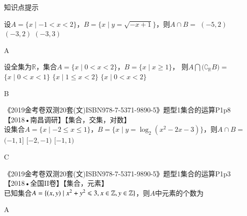 \begin{exercise}
\begin{framed}{\heiti 知识点提示}
\begin{itemize}
\begin{minipage}[t]{0.48\linewidth}
              \end{minipage}
          \end{itemize}
        \end{framed}
    \item %
          设$A=\{x\mid -1<x<2\}$，$B=\{x\mid y=\sqrt{-x+1}\}$，则$A\cap B=$\xz
          \xx{$(-1,1]$}
           {$(-5,2)$}
           {$(-3,2)$}
           {$(-3,3)$}
          \begin{answer}
            A
          \end{answer}
    \item %
      设全集为$\mathbb{R}$，集合$A=\{x\mid 0<x<2\}$，$B=\{x\mid x\geqslant1\}$，
      则$A\bigcap\bigl(\complement_{\mathbb R}B\bigr)=$\xz
       {$\{x\mid 0<x<1\}$}
       {$\{x\mid 1\leqslant x<2\}$}
       {$\{x\mid 0<x<2\}$}
      \begin{answer}
        B
      \end{answer}
    \item 《2019金考卷双测20套(文)ISBN978-7-5371-9890-5》题型1集合的运算P1p8【2018•南昌调研】【集合，交集，对数】\\
      设集合$A=\{x\mid -2\leqslant x\leqslant 1\}$，$B=\{x\mid y=\log_2{(x^2-2x-3)}\}$，则$A\cap B=$\xz
      \xx{$[-2,1)$}
       {$(-1,1]$}
       {$[-2,-1)$}
       {$[-1,1)$}
      \begin{answer}
        C
      \end{answer}
    \item 《2019金考卷双测20套(文)ISBN978-7-5371-9890-5》题型1集合的运算P1p3【2018•全国II卷】【集合，元素】\\
      已知集合$A=\{(x,y)\mid x^2+y^2\leqslant3,x\in\mathbb{Z},y\in\mathbb{Z}\}$，则$A$中元素的个数为\xz
      \begin{answer}
        A
      \end{answer}
  \end{exercise}
